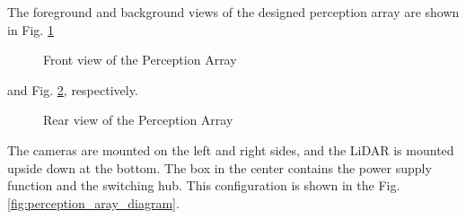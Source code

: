 \documentclass[lettersize,journal]{IEEEtran}
\begin{document}
The foreground and background views of the designed perception array are shown in Fig. \ref{fig:perception_array_front}

\begin{figure}[H]
  \begin{center}
  \end{center}
  \caption{Front view of the Perception Array}
  \label{fig:perception_array_front}
\end{figure}

and Fig. \ref{fig:perception_array_back}, respectively.

\begin{figure}[H]
  \begin{center}
  \end{center}
  \caption{Rear view of the Perception Array}
  \label{fig:perception_array_back}
\end{figure}

The cameras are mounted on the left and right sides, and the LiDAR is mounted upside down at the bottom.
The box in the center contains the power supply function and the switching hub.
This configuration is shown in the Fig. \ref{fig:perception_aray_diagram}.
\end{document}
